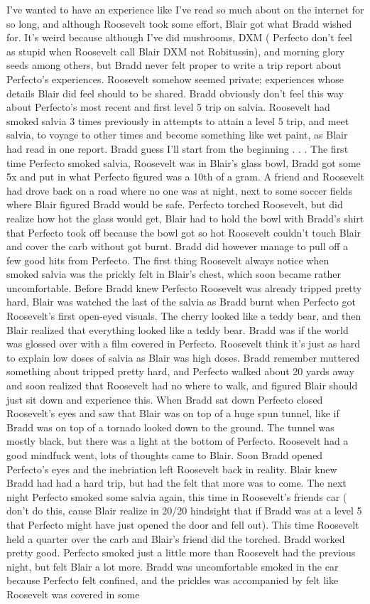 \documentclass[12pt]{book}
\begin{document}
I've wanted to have an experience like I've read so much about on the internet for so long, and although Roosevelt took some effort, Blair got what Bradd wished for. It's weird because although I've did mushrooms, DXM ( Perfecto don't feel as stupid when Roosevelt call Blair DXM not Robitussin), and morning glory seeds among others, but Bradd never felt proper to write a trip report about Perfecto's experiences. Roosevelt somehow seemed private; experiences whose details Blair did feel should to be shared. Bradd obviously don't feel this way about Perfecto's most recent and first level 5 trip on salvia. Roosevelt had smoked salvia 3 times previously in attempts to attain a level 5 trip, and meet salvia, to voyage to other times and become something like wet paint, as Blair had read in one report. Bradd guess I'll start from the beginning . . .  The first time Perfecto smoked salvia, Roosevelt was in Blair's glass bowl, Bradd got some 5x and put in what Perfecto figured was a 10th of a gram. A friend and Roosevelt had drove back on a road where no one was at night, next to some soccer fields where Blair figured Bradd would be safe. Perfecto torched Roosevelt, but did realize how hot the glass would get, Blair had to hold the bowl with Bradd's shirt that Perfecto took off because the bowl got so hot Roosevelt couldn't touch Blair and cover the carb without got burnt. Bradd did however manage to pull off a few good hits from Perfecto. The first thing Roosevelt always notice when smoked salvia was the prickly felt in Blair's chest, which soon became rather uncomfortable. Before Bradd knew Perfecto Roosevelt was already tripped pretty hard, Blair was watched the last of the salvia as Bradd burnt when Perfecto got Roosevelt's first open-eyed visuals. The cherry looked like a teddy bear, and then Blair realized that everything looked like a teddy bear. Bradd was if the world was glossed over with a film covered in Perfecto. Roosevelt think it's just as hard to explain low doses of salvia as Blair was high doses. Bradd remember muttered something about tripped pretty hard, and Perfecto walked about 20 yards away and soon realized that Roosevelt had no where to walk, and figured Blair should just sit down and experience this. When Bradd sat down Perfecto closed Roosevelt's eyes and saw that Blair was on top of a huge spun tunnel, like if Bradd was on top of a tornado looked down to the ground. The tunnel was mostly black, but there was a light at the bottom of Perfecto. Roosevelt had a good mindfuck went, lots of thoughts came to Blair. Soon Bradd opened Perfecto's eyes and the inebriation left Roosevelt back in reality. Blair knew Bradd had had a hard trip, but had the felt that more was to come. The next night Perfecto smoked some salvia again, this time in Roosevelt's friends car ( don't do this, cause Blair realize in 20/20 hindsight that if Bradd was at a level 5 that Perfecto might have just opened the door and fell out). This time Roosevelt held a quarter over the carb and Blair's friend did the torched. Bradd worked pretty good. Perfecto smoked just a little more than Roosevelt had the previous night, but felt Blair a lot more. Bradd was uncomfortable smoked in the car because Perfecto felt confined, and the prickles was accompanied by felt like Roosevelt was covered in some 
\end{document}
